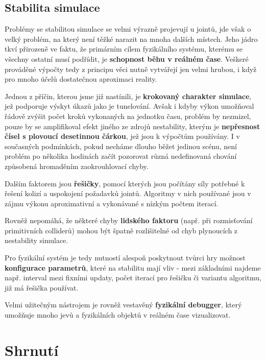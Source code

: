 \subsection{Stabilita simulace}

Problémy se stabilitou simulace se velmi výrazně projevují u jointů, jde však o velký problém, na který není těžké narazit na mnoha dalších místech. Jeho jádro tkví přirozeně ve faktu, že primárním cílem fyzikálního systému, kterému se všechny ostatní musí podřídit, je \textbf{schopnost běhu v reálném čase}. Veškeré prováděné výpočty tedy z principu věci nutně vytvářejí jen velmi hrubou, i když pro mnoho účelů dostatečnou aproximaci reality.

Jednou z příčin, kterou jsme již nastínili, je \textbf{krokovaný charakter simulace}, jež podporuje výskyt úkazů jako je tunelování. Avšak i kdyby výkon umožňoval řádově zvýšit počet kroků vykonaných na jednotku času, problém by nezmizel, pouze by se amplifikoval efekt jiného ze zdrojů nestability, kterým je \textbf{nepřesnost čísel s plovoucí desetinnou čárkou}, jež jsou k výpočtům používány. I v současných podmínkách, pokud necháme dlouho běžet jedinou scénu, není problém po několika hodinách začít pozorovat různá nedefinovaná chování způsobená hromaděním zaokrouhlovací chyby.   

Dalším faktorem jsou \textbf{řešičky}, pomocí kterých jsou počítány síly potřebné k řešení kolizí a uspokojení požadavků jointů. Algoritmy v nich používané jsou v zájmu výkonu aproximativní a vykonávané s nízkým počtem iterací.

Rovněž nepomáhá, že některé chyby \textbf{lidského faktoru} (např. při rozmisťování primitivních colliderů) mohou být špatně rozlišitelné od chyb plynoucích z nestability simulace. 

Pro fyzikální systém je tedy nutností alespoň poskytnout tvůrci hry možnost \textbf{konfigurace parametrů}, které na stabilitu mají vliv - mezi základními najdeme např. interval mezi fixními updaty, počet iterací pro řešičku či variantu algoritmu, již má řešička používat.

Velmi užitečným nástrojem je rovněž vestavěný \textbf{fyzikální debugger}, který umožňuje mnoho jevů a fyzikálních objektů v reálném čase vizualizovat.



\section{Shrnutí}

